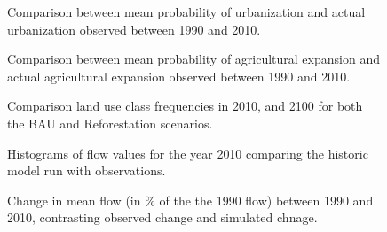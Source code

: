 
\begin{figure}[h!]
 \caption{Comparison between mean probability of urbanization and actual urbanization observed between 1990 and 2010.}
 \label{fig:compare_urb}
\end{figure}

\begin{figure}[h!]
 \caption{Comparison between mean probability of agricultural expansion and actual agricultural expansion observed between 1990 and 2010.}
 \label{fig:compare_agex}
\end{figure}


\begin{figure}[h!]
 \caption{Comparison land use class frequencies in 2010, and 2100 for both the BAU and Reforestation scenarios.}
 \label{fig:bar_both}
\end{figure}


\begin{figure}[h!]
 \caption{Histograms of flow values for the year 2010 comparing the historic model run with observations.}
 \label{fig:hist_historic}
\end{figure}



\begin{figure}[h!]
 \caption{Change in mean flow (in \% of the the 1990 flow) between 1990 and 2010, contrasting observed change and simulated chnage.}
 \label{fig:flow_historic}
\end{figure}

